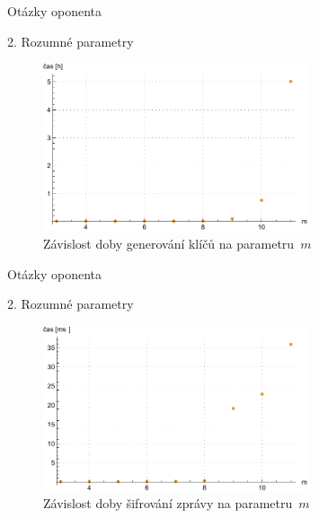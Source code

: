 \documentclass{beamer}
\begin{document}
\begin{frame}{Otázky oponenta}
    \begin{block}{2. Rozumné parametry}

        \begin{figure}
            \centering
            \includegraphics[width=0.7\textwidth]{../../implementace/grafy/listplot_mVelka_generovani.pdf}
            \caption[Časová složitost generování klíčů]{
                Závislost doby generování klíčů na parametru~$m$
            }
        \end{figure}

    \end{block}
\end{frame}

\begin{frame}{Otázky oponenta}
    \begin{block}{2. Rozumné parametry}

        \begin{figure}
            \centering
            \includegraphics[width=0.7\textwidth]{../../implementace/grafy/listplot_mVelka_sifrovani.pdf}
            \caption[Časová složitost šifrování]{
                Závislost doby šifrování zprávy na parametru~$m$
            }
        \end{figure}

    \end{block}
\end{frame}
\end{document}

